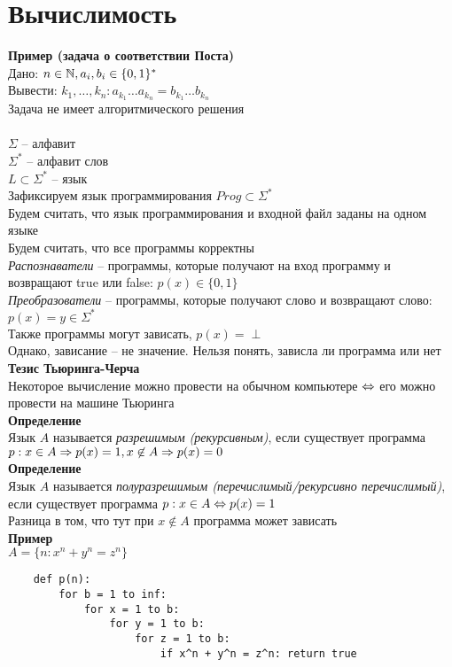 \documentclass[12pt]{article}
\begin{document}
\section{Вычислимость}
\textbf{Пример (задача о соответствии Поста)}\\
Дано: $n \in \mathbb{N}, a_i, b_i \in \{0,1\}^*$\\
Вывести: $k_1,\ldots, k_n: a_{k_1}\ldots a_{k_n} = b_{k_1}\ldots b_{k_n}$\\
Задача не имеет алгоритмического решения\\\\
$\Sigma$ -- алфавит\\
$\Sigma^*$ -- алфавит слов\\
$L \subset \Sigma^*$ -- язык\\
Зафиксируем язык программирования $Prog \subset \Sigma^*$\\
Будем считать, что язык программирования и входной файл заданы на одном языке\\
Будем считать, что все программы корректны\\
\textit{Распознаватели} -- программы, которые получают на вход программу и возвращают true или false: $p(x) \in \{0, 1\}$\\
\textit{Преобразователи} -- программы, которые получают слово и возвращают слово: $p(x) = y \in \Sigma^*$\\
Также программы могут зависать, $p(x) = \perp$\\
Однако, зависание -- не значение. Нельзя понять, зависла ли программа или нет\\
\textbf{Тезис Тьюринга-Черча}\\
Некоторое вычисление можно провести на обычном компьютере $\Leftrightarrow$ его можно провести на машине Тьюринга\\
\textbf{Определение}\\
Язык $A$ называется \textit{разрешимым (рекурсивным)}, если существует программа $p: x \in A \Rightarrow p(x) = 1, x\not\in A \Rightarrow p(x) = 0$\\
\textbf{Определение}\\
Язык $A$ называется \textit{полуразрешимым (перечислимый/рекурсивно перечислимый)}, если существует программа $p: x\in A \Leftrightarrow p(x) = 1$\\
Разница в том, что тут при $x\not\in A$ программа может зависать\\
\textbf{Пример}\\
$A = \{n: x^n + y^n = z^n\}$
\begin{lstlisting}
    def p(n):
        for b = 1 to inf:
            for x = 1 to b:
                for y = 1 to b:
                    for z = 1 to b:
                        if x^n + y^n = z^n: return true
\end{lstlisting}
\end{document}
